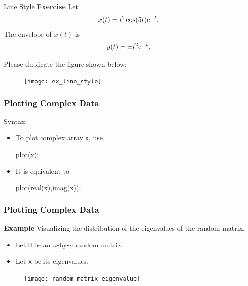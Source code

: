 \documentclass{beamer}  %
\begin{document}
\begin{frame}{Line Style}
\textbf{Exercise}
Let
\begin{equation}
    x(t) = t^2 \cos(5t) \textrm{e}^{-t}.
\end{equation}\pause
The envelope of $x(t)$ is
\begin{equation}
    y(t) = \pm t^2 \textrm{e}^{-t}.
\end{equation}\pause

Please duplicate the figure shown below:
\begin{figure}[htb]
        \centering
       \texttt{[image: ex\_line\_style]}
\end{figure}

\end{frame}
\begin{frame}[fragile]
\frametitle{Plotting Complex Data}

\begin{block}{Syntax}
\begin{itemize}[<+->]
    \item To plot complex array \texttt{x}, use
          \begin{matlabcodebeamer}[frame=none]
          plot(x);
          \end{matlabcodebeamer}
    \item It is equivalent to
          \begin{matlabcodebeamer}[frame=none]
          plot(real(x),imag(x));
          \end{matlabcodebeamer}
\end{itemize}
\end{block}

\end{frame}
\begin{frame}[fragile]
\frametitle{Plotting Complex Data}
\textbf{Example} 
Visualizing the distribution of the eigenvalues of the random matrix. \pause
\begin{itemize}
    \item Let \texttt{H} be an $n$-by-$n$ random matrix.
    \item Let \texttt{x} be its eigenvalues.
\end{itemize}

\pause
\begin{figure}[htb]
        \centering
       \texttt{[image: random\_matrix\_eigenvalue]}
\end{figure}

\end{frame}
\end{document}
